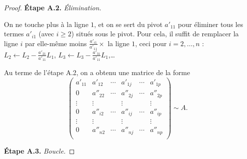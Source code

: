 \documentclass[class=report,crop=false]{standalone}
\begin{document}
\begin{proof}
\medskip
\textbf{\'Etape A.2.}  \emph{\'Elimination.}


On ne touche plus à la ligne $1$, et on se sert du pivot $a'_{11}$
pour éliminer tous les termes $a'_{i1}$ (avec $i\ge 2$) situés sous le pivot.
Pour cela, il suffit de remplacer la ligne $i$ par
elle-même moins $\frac{a'_{i1}}{a'_{11}}\times$ la ligne $1$, ceci pour $i=2,\ldots,n$ :
$L_2 \leftarrow L_2 - \frac{a'_{21}}{a'_{11}}L_1$,
$L_3 \leftarrow L_3 - \frac{a'_{31}}{a'_{11}}L_1$,\ldots

Au terme de l'étape A.2, on a obtenu une matrice de la forme
$$\begin{pmatrix}
a'_{11}&a'_{12}&\cdots&a'_{1j}&\cdots&a'_{1p}\\
0&a''_{22}&\cdots&a''_{2j}&\cdots&a''_{2p}\\
\vdots&\vdots&&\vdots&&\vdots\\
0&a''_{i2}&\cdots&a''_{ij}&\cdots&a''_{ip}\\
\vdots&\vdots&&\vdots&&\vdots\\
0&a''_{n2}&\cdots&a''_{nj}&\cdots&a''_{np}\\
\end{pmatrix}\sim A.
$$

\medskip
\textbf{\'Etape A.3.}  \emph{Boucle.}


\end{proof}
\end{document}
